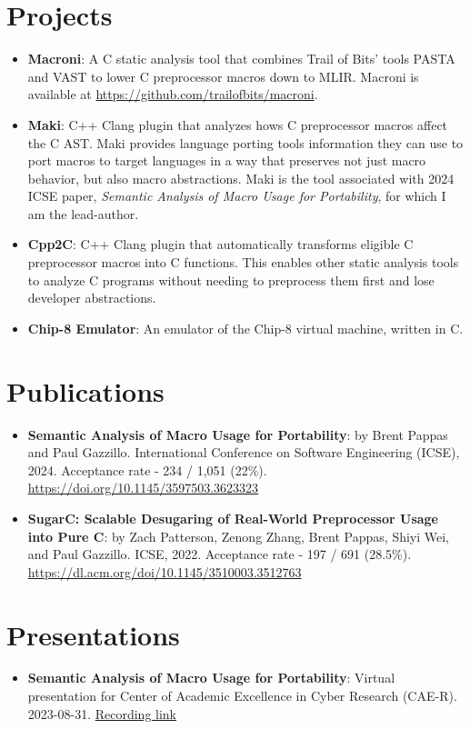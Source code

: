\documentclass{article}
\newcommand{\resumeItem}[2]{
  \item\small{
    \textbf{#1}{: #2 \vspace{-2pt}}
  }
}
\newcommand{\resumeSubItem}[2]{\resumeItem{#1}{#2}\vspace{-3pt}}
\newcommand{\resumeSubHeadingListStart}{\begin{itemize}[leftmargin=*, label={}]}
\newcommand{\resumeSubHeadingListEnd}{\end{itemize}}
\begin{document}
\section{Projects}
\resumeSubHeadingListStart{}
\resumeItem{Macroni}
{A C static analysis tool that combines Trail of Bits' tools
	PASTA and VAST to lower C preprocessor macros down to MLIR.\@
	Macroni is available at \href{https://github.com/trailofbits/macroni}{https://github.com/trailofbits/macroni}.}
\resumeItem{Maki}
{C++ Clang plugin that analyzes hows C preprocessor macros affect the C AST\@.
Maki provides language porting tools information they can use to port macros to
target languages in a way that preserves not just macro behavior, but also macro
abstractions. Maki is the tool associated with 2024 ICSE paper,
\textit{Semantic Analysis of Macro Usage for Portability}, for which I am the lead-author.}
\vspace{2pt}
\resumeItem{Cpp2C}
{C++ Clang plugin that automatically transforms eligible C preprocessor macros into C functions.
	This enables other static analysis tools to analyze C programs without needing to preprocess them first and lose developer abstractions.}
\vspace{2pt}
\resumeItem{Chip-8 Emulator}
{An emulator of the Chip-8 virtual machine, written in C.}
\resumeSubHeadingListEnd{}

\vspace{-5pt}
\section{Publications}
\resumeSubHeadingListStart{}

\resumeSubItem{Semantic Analysis of Macro Usage for Portability}
{by Brent Pappas and Paul Gazzillo. International Conference on Software Engineering (ICSE), 2024. Acceptance rate - 234 / 1,051 (22\%). \url{https://doi.org/10.1145/3597503.3623323}}

\resumeSubItem{SugarC\@: Scalable Desugaring of Real-World Preprocessor Usage into Pure C}
{by Zach Patterson, Zenong Zhang, Brent Pappas, Shiyi Wei, and Paul Gazzillo. ICSE, 2022. Acceptance rate - 197 / 691 (28.5\%). \url{https://dl.acm.org/doi/10.1145/3510003.3512763}}
\resumeSubHeadingListEnd{}

\vspace{-5pt}
\section{Presentations}
\resumeSubHeadingListStart{}
\resumeSubItem{Semantic Analysis of Macro Usage for Portability}
{Virtual presentation for Center of Academic Excellence in Cyber Research (CAE-R). 2023{-}08{-}31. \href{https://drive.google.com/file/d/1xCd34w54hs1iyaoXHz0MUkwlH-fP3HLo/view} {Recording link}}
\resumeSubHeadingListEnd{}
\end{document}

